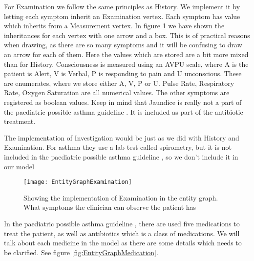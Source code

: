 For Examination we follow the same principles as History. We implement it by letting each symptom inherit an Examination vertex. Each symptom has value which inherits from a Measurement vertex. In figure \ref{fig:EntityGraphExamination} we have shown the inheritances for each vertex with one arrow and a box. This is of practical reasons when drawing, as there are so many symptoms and it will be confusing to draw an arrow for each of them. Here the values which are stored are a bit more mixed than for History. Consciousness is measured using an AVPU scale, where A is the patient is Alert, V is Verbal, P is responding to pain and U unconscious. These are enumerates, where we store either A, V, P or U. Pulse Rate, Respiratory Rate, Oxygen Saturation are all numerical values. The other symptoms are registered as boolean values. Keep in mind that Jaundice is really not a part of the paediatric possible asthma guideline \parencite{RepublicofKeny2016}. It is included as part of the antibiotic treatment.


The implementation of Investigation would be just as we did with History and Examination. For asthma they use a lab test called spirometry, but it is not included in the paediatric possible asthma guideline \parencite{RepublicofKeny2016}, so we don't include it in our model

\begin{figure}[h!]
	\label{fig:EntityGraphExamination}
	\texttt{[image: EntityGraphExamination]}
	\caption {Showing the implementation of Examination in the entity graph. What symptoms the clinician can observe the patient has}
\end{figure}

In the paediatric possible asthma guideline \parencite{RepublicofKeny2016}, there are used five medications to treat the patient, as well as antibiotics which is a class of medications. We will talk about each medicine in the model as there are some details which needs to be clarified. See figure \ref{fig:EntityGraphMedication}.


